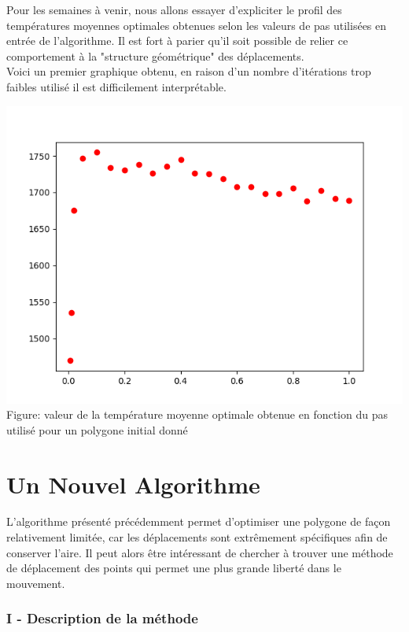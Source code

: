 \documentclass[a4paper,reqno]{article}
\newcommand{\pa}{\hspace{0.5cm}}
\begin{document}
Pour les semaines à venir, nous allons essayer d'expliciter le profil des températures moyennes optimales obtenues selon les valeurs de pas utilisées en entrée de l'algorithme. Il est fort à parier qu'il soit possible de relier ce comportement à la "structure géométrique" des déplacements.
\\ Voici un premier graphique obtenu, en raison d'un nombre d'itérations trop faibles utilisé il est difficilement interprétable.
\begin{center}
	\includegraphics[scale=0.5]{plotPas.png}
	\\ Figure: valeur de la température moyenne optimale obtenue en fonction du pas utilisé pour un polygone initial donné
\end{center}


\newpage
\part{Un Nouvel Algorithme} 
\pa L'algorithme présenté précédemment permet d'optimiser une polygone de façon relativement limitée, car les déplacements sont extrêmement spécifiques afin de conserver l'aire. Il peut alors être intéressant de chercher à trouver une méthode de déplacement des points qui permet une plus grande liberté dans le mouvement. 

\section*{I - Description de la méthode}
\end{document}
